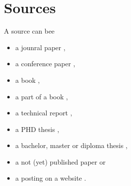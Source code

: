 \section{Sources}

A source can bee
\begin{itemize}
  \item a jounral paper \cite{MopOverview},
  \item a conference paper \cite{rltl},
  \item a book \cite{scala},
  \item a part of a book \cite{moore},
  \item a technical report \cite{bitkom},
  \item a PHD thesis \cite{Leucker02},
  \item a bachelor, master or diploma thesis \cite{RltlConv},
  \item a not (yet) published paper \cite{ptLTL} or
  \item a posting on a website \cite{codecommit}.
\end{itemize}


